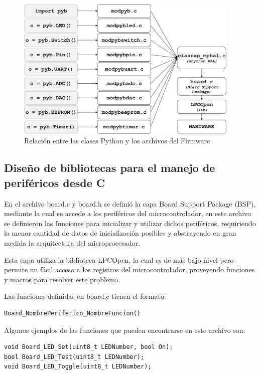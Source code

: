 \begin{figure}[ht]
  \centering
    \includegraphics[width=0.95\textwidth]{Figures/fig_files}
  \caption{Relación entre las clases Python y los archivos del Firmware}
  \label{fig:files}
\end{figure}


\subsection{Diseño de bibliotecas para el manejo de periféricos desde C}

En el archivo board.c y board.h se definió la capa Board Support Package (BSP), mediante la cual se accede a los periféricos del microcontrolador, en este archivo se definieron las funciones para inicializar y utilizar dichos periféricos, requiriendo la menor cantidad de datos de inicialización posibles y abstrayendo en gran medida la arquitectura del microprocesador.

Esta capa utiliza la biblioteca LPCOpen, la cual es de más bajo nivel pero permite un fácil acceso a los registros del microcontrolador, proveyendo funciones y macros para resolver este problema.

Las funciones definidas en board.c tienen el formato:

\begin{verbatim}
Board_NombrePeriferico_NombreFuncion()
\end{verbatim}

Algunos ejemplos de las funciones que pueden encontrarse en este archivo son:

\begin{verbatim}
void Board_LED_Set(uint8_t LEDNumber, bool On);
bool Board_LED_Test(uint8_t LEDNumber);
void Board_LED_Toggle(uint8_t LEDNumber);
\end{verbatim}

